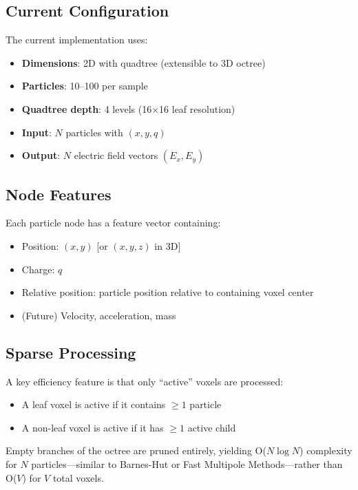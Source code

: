 \documentclass[11pt,a4paper]{article}
\begin{document}
\subsection{Current Configuration}

The current implementation uses:
\begin{itemize}
    \item \textbf{Dimensions}: 2D with quadtree (extensible to 3D octree)
    \item \textbf{Particles}: 10--100 per sample
    \item \textbf{Quadtree depth}: 4 levels (16$\times$16 leaf resolution)
    \item \textbf{Input}: $N$ particles with $(x, y, q)$
    \item \textbf{Output}: $N$ electric field vectors $(E_x, E_y)$
\end{itemize}

\subsection{Node Features}

Each particle node has a feature vector containing:
\begin{itemize}
    \item Position: $(x, y)$ [or $(x, y, z)$ in 3D]
    \item Charge: $q$
    \item Relative position: particle position relative to containing voxel center
    \item (Future) Velocity, acceleration, mass
\end{itemize}

\subsection{Sparse Processing}

A key efficiency feature is that only ``active'' voxels are processed:
\begin{itemize}
    \item A leaf voxel is active if it contains $\geq 1$ particle
    \item A non-leaf voxel is active if it has $\geq 1$ active child
\end{itemize}

Empty branches of the octree are pruned entirely, yielding O($N \log N$) complexity for $N$ particles---similar to Barnes-Hut or Fast Multipole Methods---rather than O($V$) for $V$ total voxels.
\end{document}
